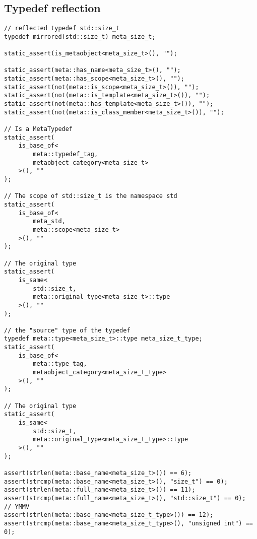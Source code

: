 \subsection{Typedef reflection}

\begin{verbatim}
// reflected typedef std::size_t
typedef mirrored(std::size_t) meta_size_t;

static_assert(is_metaobject<meta_size_t>(), "");

static_assert(meta::has_name<meta_size_t>(), "");
static_assert(meta::has_scope<meta_size_t>(), "");
static_assert(not(meta::is_scope<meta_size_t>()), "");
static_assert(not(meta::is_template<meta_size_t>()), "");
static_assert(not(meta::has_template<meta_size_t>()), "");
static_assert(not(meta::is_class_member<meta_size_t>()), "");

// Is a MetaTypedef
static_assert(
	is_base_of<
		meta::typedef_tag,
		metaobject_category<meta_size_t>
	>(), ""
);

// The scope of std::size_t is the namespace std
static_assert(
	is_base_of<
		meta_std,
		meta::scope<meta_size_t>
	>(), ""
);

// The original type
static_assert(
	is_same<
		std::size_t,
		meta::original_type<meta_size_t>::type
	>(), ""
);

// the "source" type of the typedef
typedef meta::type<meta_size_t>::type meta_size_t_type;
static_assert(
	is_base_of<
		meta::type_tag,
		metaobject_category<meta_size_t_type>
	>(), ""
);

// The original type
static_assert(
	is_same<
		std::size_t,
		meta::original_type<meta_size_t_type>::type
	>(), ""
);

assert(strlen(meta::base_name<meta_size_t>()) == 6);
assert(strcmp(meta::base_name<meta_size_t>(), "size_t") == 0);
assert(strlen(meta::full_name<meta_size_t>()) == 11);
assert(strcmp(meta::full_name<meta_size_t>(), "std::size_t") == 0);
// YMMV
assert(strlen(meta::base_name<meta_size_t_type>()) == 12);
assert(strcmp(meta::base_name<meta_size_t_type>(), "unsigned int") == 0);
\end{verbatim}

